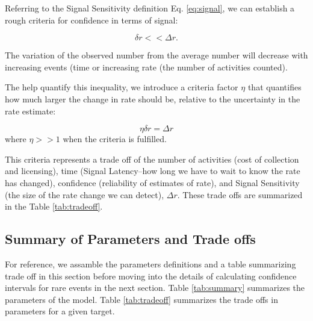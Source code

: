 \documentclass{article}
\begin{document}
Referring to the Signal Sensitivity definition Eq. \ref{eq:signal}, we can establish a rough criteria for confidence in terms of signal: 

\begin{equation}
    \label{eq:criteria}
    \delta r << \Delta r.
\end{equation}

The variation of the observed number from the average number will decrease with increasing events (time or increasing rate (the number of activities counted).

The help quantify this inequality, we introduce a criteria factor $\eta$ that quantifies how much larger the change in rate should be, relative to the uncertainty in the rate estimate:

\begin{equation}
    \label{eq:criteriaParam}
    \eta \delta r = \Delta r
\end{equation}
where $\eta >> 1$ when the criteria is fulfilled.

This criteria represents a trade off of the number of activities (cost of collection and licensing), time (Signal Latency--how long we have to wait to know the rate has changed), confidence (reliability of estimates of rate), and Signal Sensitivity (the size of the rate change we can detect), $\Delta r$. These trade offs are summarized in the Table \ref{tab:tradeoff}.

\subsection{Summary of Parameters and Trade offs}

For reference, we assamble the parameters definitions and a table summarizing trade off in this section before moving into the details of calculating confidence intervals for rare events in the next section.  Table \ref{tab:summary} summarizes the parameters of the model. Table \ref{tab:tradeoff} summarizes the trade offs in parameters for a given target.
\end{document}
